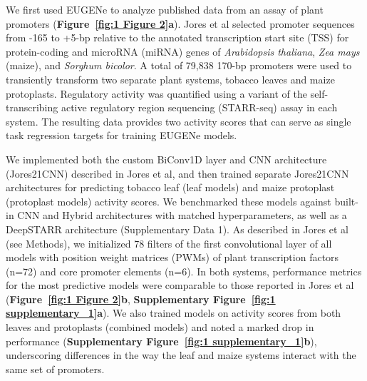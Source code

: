 We first used EUGENe to analyze published data from an assay of plant promoters\cite{Jores2021-iu} (\textbf{Figure~\ref{fig:1 Figure 2}a}). Jores et al selected promoter sequences from -165 to +5-bp relative to the annotated transcription start site (TSS) for protein-coding and microRNA (miRNA) genes of \textit{Arabidopsis thaliana}, \textit{Zea mays} (maize), and \textit{Sorghum bicolor}. A total of 79,838 170-bp promoters were used to transiently transform two separate plant systems, tobacco leaves and maize protoplasts. Regulatory activity was quantified using a variant of the self-transcribing active regulatory region sequencing (STARR-seq) assay\cite{Jores2020-hm} in each system. The resulting data provides two activity scores that can serve as single task regression targets for training EUGENe models.

We implemented both the custom BiConv1D layer\cite{Onimaru2020-do} and CNN architecture (Jores21CNN) described in Jores et al, and then trained separate Jores21CNN architectures for predicting tobacco leaf (leaf models) and maize protoplast (protoplast models) activity scores. We benchmarked these models against built-in CNN and Hybrid architectures with matched hyperparameters, as well as a DeepSTARR architecture\cite{De_Almeida2022-aa} (Supplementary Data 1). As described in Jores et al (see Methods), we initialized 78 filters of the first convolutional layer of all models with position weight matrices (PWMs) of plant transcription factors (n=72) and core promoter elements (n=6)\cite{Jores2021-iu}. In both systems, performance metrics for the most predictive models were comparable to those reported in Jores et al (\textbf{Figure~\ref{fig:1 Figure 2}b}, \textbf{Supplementary Figure~\ref{fig:1 supplementary_1}a}). We also trained models on activity scores from both leaves and protoplasts (combined models) and noted a marked drop in performance (\textbf{Supplementary Figure~\ref{fig:1 supplementary_1}b}), underscoring differences in the way the leaf and maize systems interact with the same set of promoters\cite{Jores2021-iu}.

